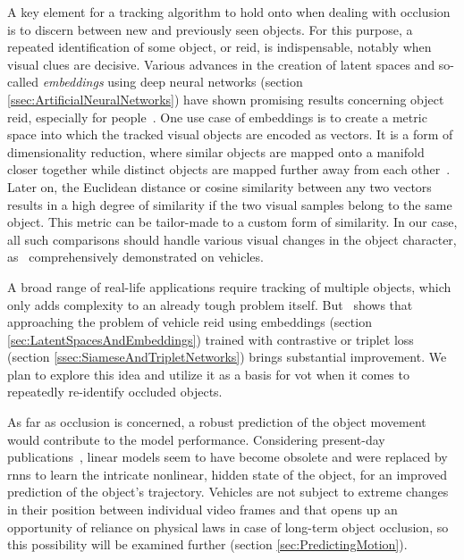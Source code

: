 A key element for a tracking algorithm to hold onto when dealing with occlusion is to discern between new and previously seen objects. For this purpose, a repeated identification of some object, or \gls{reid}, is indispensable, notably when visual clues are decisive. Various advances in the creation of latent spaces and so-called \emph{embeddings} using deep neural networks (section \ref{ssec:ArtificialNeuralNetworks}) have shown promising results concerning object \gls{reid}, especially for people~\cite{Schroff2015, Taigman2014}. One use case of embeddings is to create a metric space into which the tracked visual objects are encoded as vectors. It is a form of dimensionality reduction, where similar objects are mapped onto a manifold closer together while distinct objects are mapped further away from each other~\cite{Hadsell2006}. Later on, the Euclidean distance or cosine similarity between any two vectors results in a high degree of similarity if the two visual samples belong to the same object. This metric can be tailor-made to a custom form of similarity. In our case, all such comparisons should handle various visual changes in the object character, as~\cite{Kuma2019} comprehensively demonstrated on vehicles.

A broad range of real-life applications require tracking of multiple objects, which only adds complexity to an already tough problem itself. But~\cite{Kuma2019} shows that approaching the problem of vehicle \gls{reid} using embeddings (section \ref{sec:LatentSpacesAndEmbeddings}) trained with contrastive or triplet loss (section \ref{ssec:SiameseAndTripletNetworks}) brings substantial improvement. We plan to explore this idea and utilize it as a basis for \gls{vot} when it comes to repeatedly re-identify occluded objects.

As far as occlusion is concerned, a robust prediction of the object movement would contribute to the model performance. Considering present-day publications~\cite{Tan2019}, linear models seem to have become obsolete and were replaced by \glspl{rnn} to learn the intricate nonlinear, hidden state of the object, for an improved prediction of the object’s trajectory. Vehicles are not subject to extreme changes in their position between individual video frames and that opens up an opportunity of reliance on physical laws in case of long-term object occlusion, so this possibility will be examined further (section \ref{sec:PredictingMotion}).

